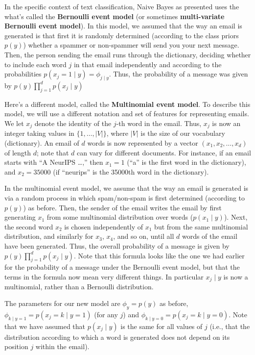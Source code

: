 In the specific context of text classification, Naive Bayes as presented uses
the what's called the \textbf{Bernoulli event model} (or sometimes \textbf{multi-variate
Bernoulli event model}). In this model, we assumed that the way an email
is generated is that first it is randomly determined (according to the class
priors $p(y)$) whether a spammer or non-spammer will send you your next
message. Then, the person sending the email runs through the dictionary,
deciding whether to include each word $j$ in that email independently and
according to the probabilities $p(x_j = 1 \mid y) = \phi_{j \mid y}$. Thus, the probability of a
message was given by $p(y) \prod_{j=1}^d p(x_j \mid y)$

Here's a different model, called the \textbf{Multinomial event model}. To
describe this model, we will use a different notation and set of features for
representing emails. We let $x_j$ denote the identity of the $j$-th word in the
email. Thus, $x_j$ is now an integer taking values in $\{1,\ldots,|V|\}$, where $|V|$
is the size of our vocabulary (dictionary). An email of $d$ words is now represented
by a vector $(x_1 ,x_2 ,\ldots,x_d )$ of length $d$; note that $d$ can vary for
different documents. For instance, if an email starts with ``A NeurIPS \ldots,''
then $x_1 = 1$ (``a'' is the first word in the dictionary), and $x_2 = 35000$ (if
``neurips'' is the 35000th word in the dictionary).

In the multinomial event model, we assume that the way an email is
generated is via a random process in which spam/non-spam is first determined
(according to $p(y)$) as before. Then, the sender of the email writes the
email by first generating $x_1$ from some multinomial distribution over words
($p(x_1 \mid y)$). Next, the second word $x_2$ is chosen independently of $x_1$ but from
the same multinomial distribution, and similarly for $x_3$, $x_4$, and so on, until
all $d$ words of the email have been generated. Thus, the overall probability of
a message is given by $p(y)
\prod^d_{j=1} p(x_j \mid y)$. Note that this formula looks like the
one we had earlier for the probability of a message under the Bernoulli event
model, but that the terms in the formula now mean very different things. In
particular $x_j \mid y$ is now a multinomial, rather than a Bernoulli distribution.

The parameters for our new model are $\phi_y = p(y)$ as before, $\phi_{k \mid y=1} =
p(x_j = k \mid y = 1)$ (for any $j$) and $\phi_{k \mid y=0} = p(x_j = k \mid y = 0)$. Note that we have
assumed that $p(x_j \mid y)$ is the same for all values of $j$ (i.e., that the distribution
according to which a word is generated does not depend on its position $j$
within the email).

